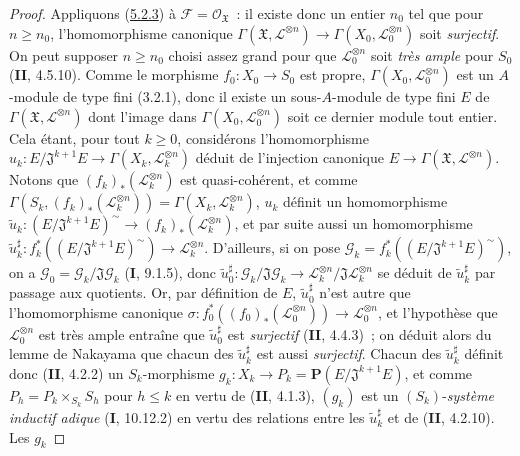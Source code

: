 \begin{proof}
Appliquons (\hyperref[III.5.2.3-fr]{5.2.3}) à
$\mathcal F=\mathcal O_{\mathfrak X}$~: il existe donc un entier $n_0$ tel que
pour $n\geq n_0$, l'homomorphisme canonique
$\Gamma(\mathfrak X,\mathcal L^{\otimes n})\to
\Gamma(X_0,\mathcal L_0^{\otimes n})$ soit \emph{surjectif}. On peut supposer
$n\geq n_0$ choisi assez grand pour que $\mathcal L_0^{\otimes n}$ soit \emph{très
ample} pour $S_0$ (\textbf{II}, 4.5.10). Comme le morphisme $f_0:X_0\to S_0$ est propre,
$\Gamma(X_0,\mathcal L_0^{\otimes n})$ est un $A$-module de type fini (3.2.1),
donc il existe un sous-$A$-module de type fini $E$ de
$\Gamma(\mathfrak X,\mathcal L^{\otimes n})$ dont l'image dans
$\Gamma(X_0,\mathcal L_0^{\otimes n})$ soit ce dernier module tout entier.
Cela étant, pour tout $k\geq0$, considérons l'homomorphisme
$u_k:E/\mathfrak J^{k+1}E\longrightarrow
\Gamma(X_k,\mathcal L_k^{\otimes n})$
déduit de l'injection canonique
$E\to\Gamma(\mathfrak X,\mathcal L^{\otimes n})$. Notons que
$(f_k)_*(\mathcal L_k^{\otimes n})$ est quasi-cohérent, et comme
$\Gamma(S_k,(f_k)_*(\mathcal L_k^{\otimes n}))
=\Gamma(X_k,\mathcal L_k^{\otimes n})$, $u_k$ définit un homomorphisme
$\widetilde u_k:(E/\mathfrak J^{k+1}E)^\sim
\longrightarrow(f_k)_*(\mathcal L_k^{\otimes n})$,
et par suite aussi un homomorphisme
$\widetilde u_k^\sharp:
f_k^*((E/\mathfrak J^{k+1}E)^\sim)\longrightarrow
\mathcal L_k^{\otimes n}$.
D'ailleurs, si on pose
$\mathcal G_k=f_k^*((E/\mathfrak J^{k+1}E)^\sim)$, on a
$\mathcal G_0=\mathcal G_k/\mathfrak J\mathcal G_k$ (\textbf{I}, 9.1.5), donc
$\widetilde u_0^\sharp:\mathcal G_k/\mathfrak J\mathcal G_k
\to\mathcal L_k^{\otimes n}/\mathfrak J\mathcal L_k^{\otimes n}$ se déduit
de $\widetilde u_k^\sharp$ par passage aux quotients. Or, par définition de
$E$, $\widetilde u_0^\sharp$ n'est autre que l'homomorphisme canonique
$\sigma:f_0^*((f_0)_*(\mathcal L_0^{\otimes n}))\longrightarrow
\mathcal L_0^{\otimes n}$,
et l'hypothèse que $\mathcal L_0^{\otimes n}$ est très ample entraîne que
$\widetilde u_0^\sharp$ est \emph{surjectif} (\textbf{II}, 4.4.3)~; on déduit alors du lemme
de Nakayama que chacun des $\widetilde u_k^\sharp$ est aussi \emph{surjectif}.
Chacun des $\widetilde u_k^\sharp$ définit donc (\textbf{II}, 4.2.2) un
$S_k$-morphisme
$g_k:X_k\longrightarrow P_k=\mathbf P(E/\mathfrak J^{k+1}E)$,
et comme $P_h=P_k\times_{S_k}S_h$ pour $h\leq k$ en vertu de (\textbf{II}, 4.1.3),
$(g_k)$ est un $(S_k)$-\emph{système inductif adique} (\textbf{I}, 10.12.2) en vertu des
relations entre les $\widetilde u_k^\sharp$ et de (\textbf{II}, 4.2.10). Les $g_k$

\end{proof}
